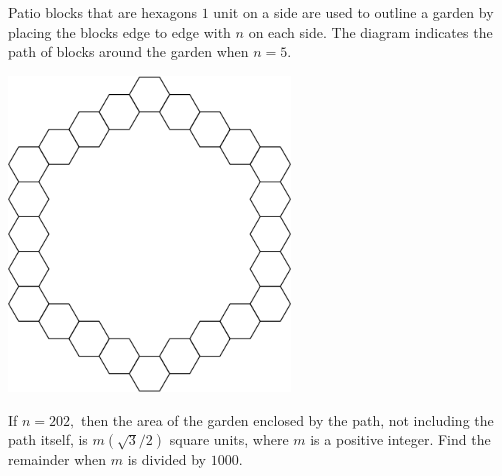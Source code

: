 Patio blocks that are hexagons $1$ unit on a side are used to outline a garden by placing the blocks edge to edge with $n$ on each side. The diagram indicates the path of blocks around the garden when $n=5.$

\begin{center}
\includegraphics[width = 75.0mm]{img/fig0.png}
\end{center}
If $n=202,$ then the area of the garden enclosed by the path, not including the path itself, is $m(\sqrt{3}/2)$ square units, where $m$ is a positive integer. Find the remainder when $m$ is divided by $1000.$